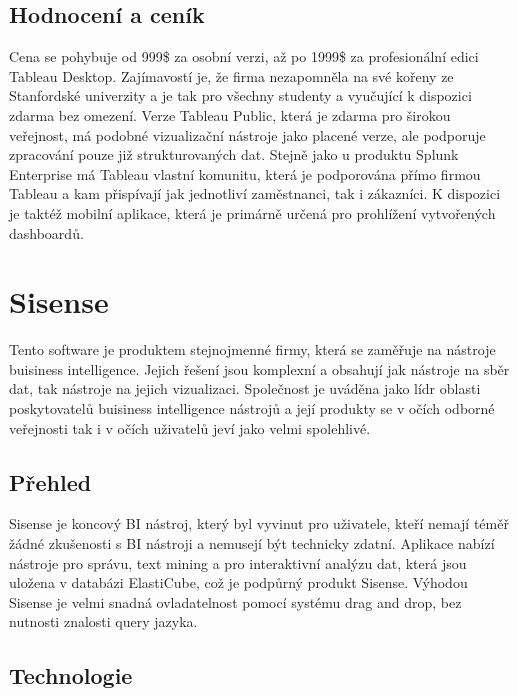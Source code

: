 \documentclass[czech,BP]{thesiskiv}
\begin{document}
 \subsection{Hodnocení a ceník}
 Cena se pohybuje od 999\$ za osobní verzi, až po 1999\$ za profesionální edici Tableau Desktop.\cite{TableauPricing} Zajímavostí je, že firma nezapomněla na své kořeny ze Stanfordské univerzity a je tak pro všechny studenty a vyučující k dispozici zdarma bez omezení. Verze Tableau Public, která je zdarma pro širokou veřejnost, má podobné vizualizační nástroje jako placené verze, ale podporuje zpracování pouze již strukturovaných dat. Stejně jako u produktu Splunk Enterprise má Tableau vlastní komunitu, která je podporována přímo firmou Tableau a kam přispívají jak jednotliví zaměstnanci, tak i zákazníci. K dispozici je taktéž mobilní aplikace, která je primárně určená pro prohlížení vytvořených dashboardů. 
 
 
 \section{Sisense}
  Tento software je produktem stejnojmenné firmy, která se zaměřuje na nástroje buisiness intelligence. Jejich řešení jsou komplexní a obsahují jak nástroje na sběr dat, tak nástroje na jejich vizualizaci. Společnost je uváděna jako lídr oblasti poskytovatelů buisiness intelligence nástrojů a její produkty se v očích odborné veřejnosti tak i v očích uživatelů jeví jako velmi spolehlivé.\cite{SisenseStandings}
 
 \subsection{Přehled}

 Sisense je koncový BI nástroj, který byl vyvinut pro uživatele, kteří nemají téměř žádné zkušenosti s BI nástroji a nemusejí být technicky zdatní. Aplikace nabízí nástroje pro správu, text mining a pro interaktivní analýzu dat, která jsou uložena v databázi ElastiCube, což je podpůrný produkt Sisense. Výhodou Sisense je velmi snadná ovladatelnost pomocí systému drag and drop, bez nutnosti znalosti query jazyka.
 \subsection{Technologie}
\end{document}
